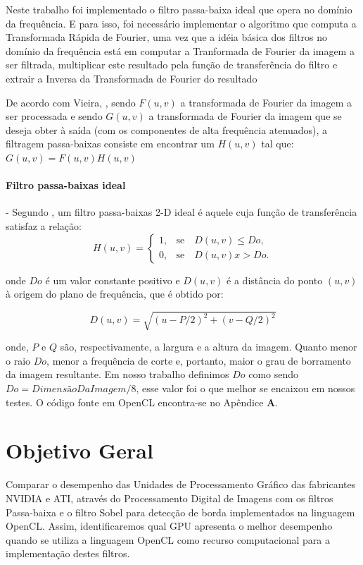 Neste trabalho foi implementado o filtro passa-baixa ideal que opera no domínio da frequência. E para isso, foi necessário implementar o algoritmo que computa a Transformada Rápida de Fourier, uma vez que a idéia básica dos filtros no domínio da frequência está em computar a Tranformada de Fourier da imagem a ser filtrada, multiplicar este resultado pela função de transferência do filtro e extrair a Inversa da Transformada de Fourier do resultado  

De acordo com Vieira, \cite{MarquesFilho1999}, sendo $F(u,v)$ a transformada de Fourier da imagem a ser processada e sendo $G(u,v)$ a transformada de Fourier da imagem que se deseja obter à saída (com os componentes de alta frequência atenuados), a filtragem passa-baixas consiste em encontrar um $H(u,v)$ tal que: 
$G(u,v) = F(u,v)H(u,v)$

\paragraph{Filtro passa-baixas ideal} - Segundo \cite{Gonzalez:2006:DIP:1076432}, um filtro passa-baixas 2-D ideal é aquele cuja função de transferência satisfaz a relação:
$$
H(u,v)=\begin{cases}
1,	&\mbox{se}\quad D(u,v)\le Do,\\
0,	&\mbox{se}\quad D(u,v)x>Do.
\end{cases}
$$

onde $Do$ é um valor constante positivo e $D(u,v)$ é a distância do ponto $(u,v)$ à origem do plano de frequência, que é obtido por: 

$$
D(u,v) = \sqrt{(u - P/2)^2 + (v - Q/2)^2}
$$

onde, $P$ e $Q$ são, respectivamente, a largura e a altura da imagem. Quanto menor o raio $Do$, menor a frequência de corte e, portanto, maior o grau de borramento da imagem resultante. 
Em nosso trabalho definimos $Do$ como sendo $Do=DimensãoDaImagem/8$, esse valor foi o que melhor se encaixou em nossos testes.
O código fonte em OpenCL encontra-se no Apêndice \textbf{A}.

\section{Objetivo Geral}
Comparar o desempenho das Unidades de Processamento Gráfico das fabricantes NVIDIA e ATI, através do Processamento Digital de Imagens com os filtros Passa-baixa e o filtro Sobel para detecção de borda implementados na linguagem OpenCL. Assim, identificaremos qual GPU apresenta o melhor desempenho quando se utiliza  a linguagem OpenCL como recurso computacional para a implementação destes filtros.
